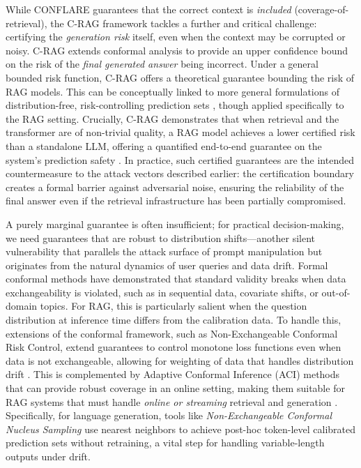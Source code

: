\documentclass[11pt]{article}
\begin{document}
While CONFLARE guarantees that the correct context is \emph{included} (coverage-of-retrieval), the C-RAG framework tackles a further and critical challenge: certifying the \emph{generation risk} itself, even when the context may be corrupted or noisy. C-RAG \cite{ref186} extends conformal analysis to provide an upper confidence bound on the risk of the \emph{final generated answer} being incorrect. Under a general bounded risk function, C-RAG offers a theoretical guarantee bounding the risk of RAG models. This can be conceptually linked to more general formulations of distribution-free, risk-controlling prediction sets \cite{ref290}, though applied specifically to the RAG setting. Crucially, C-RAG demonstrates that when retrieval and the transformer are of non-trivial quality, a RAG model achieves a lower certified risk than a standalone LLM, offering a quantified end-to-end guarantee on the system's prediction safety \cite{ref186}. In practice, such certified guarantees are the intended countermeasure to the attack vectors described earlier: the certification boundary creates a formal barrier against adversarial noise, ensuring the reliability of the final answer even if the retrieval infrastructure has been partially compromised.

A purely marginal guarantee is often insufficient; for practical decision-making, we need guarantees that are robust to distribution shifts---another silent vulnerability that parallels the attack surface of prompt manipulation but originates from the natural dynamics of user queries and data drift. Formal conformal methods have demonstrated that standard validity breaks when data exchangeability is violated, such as in sequential data, covariate shifts, or out-of-domain topics. For RAG, this is particularly salient when the question distribution at inference time differs from the calibration data. To handle this, extensions of the conformal framework, such as Non-Exchangeable Conformal Risk Control, extend guarantees to control monotone loss functions even when data is not exchangeable, allowing for weighting of data that handles distribution drift \cite{ref291}. This is complemented by Adaptive Conformal Inference (ACI) methods that can provide robust coverage in an online setting, making them suitable for RAG systems that must handle \emph{online or streaming} retrieval and generation \cite{ref292}. Specifically, for language generation, tools like \emph{Non-Exchangeable Conformal Nucleus Sampling} \cite{ref293} use nearest neighbors to achieve post-hoc token-level calibrated prediction sets without retraining, a vital step for handling variable-length outputs under drift.
\end{document}
